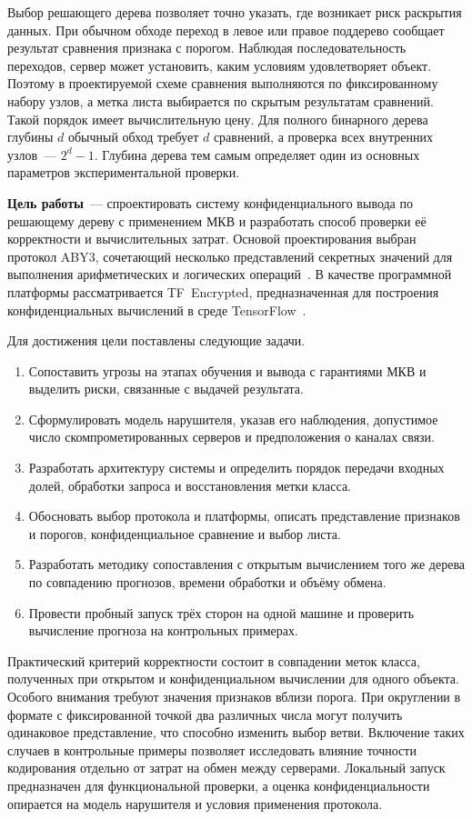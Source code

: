 Выбор решающего дерева позволяет точно указать, где возникает риск
раскрытия данных. При обычном обходе переход в левое или правое поддерево
сообщает результат сравнения признака с порогом. Наблюдая последовательность
переходов, сервер может установить, каким условиям удовлетворяет объект.
Поэтому в проектируемой схеме сравнения выполняются по фиксированному
набору узлов, а метка листа выбирается по скрытым результатам сравнений.
Такой порядок имеет вычислительную цену. Для полного бинарного дерева
глубины $d$ обычный обход требует $d$ сравнений, а проверка всех внутренних
узлов~--- $2^d-1$. Глубина дерева тем самым определяет один из основных
параметров экспериментальной проверки.

\textbf{Цель работы}~--- спроектировать систему конфиденциального вывода
по решающему дереву с применением МКВ и разработать способ проверки
её корректности и вычислительных затрат. Основой проектирования выбран
протокол ABY3, сочетающий несколько представлений секретных значений
для выполнения арифметических и логических операций~\cite{mohassel2018aby3}.
В качестве программной платформы рассматривается TF~Encrypted,
предназначенная для построения конфиденциальных вычислений в среде
TensorFlow~\cite{dahl2018tfe}.

Для достижения цели поставлены следующие задачи.
\begin{enumerate}
    \item Сопоставить угрозы на этапах обучения и вывода с гарантиями МКВ
    и выделить риски, связанные с выдачей результата.
    \item Сформулировать модель нарушителя, указав его наблюдения,
    допустимое число скомпрометированных серверов и предположения о каналах связи.
    \item Разработать архитектуру системы и определить порядок передачи
    входных долей, обработки запроса и восстановления метки класса.
    \item Обосновать выбор протокола и платформы, описать представление
    признаков и порогов, конфиденциальное сравнение и выбор листа.
    \item Разработать методику сопоставления с открытым вычислением того же
    дерева по совпадению прогнозов, времени обработки и объёму обмена.
    \item Провести пробный запуск трёх сторон на одной машине
    и проверить вычисление прогноза на контрольных примерах.
\end{enumerate}

Практический критерий корректности состоит в совпадении меток класса,
полученных при открытом и конфиденциальном вычислении для одного объекта.
Особого внимания требуют значения признаков вблизи порога. При округлении
в формате с фиксированной точкой два различных числа могут получить
одинаковое представление, что способно изменить выбор ветви. Включение
таких случаев в контрольные примеры позволяет исследовать влияние точности
кодирования отдельно от затрат на обмен между серверами. Локальный запуск
предназначен для функциональной проверки, а оценка конфиденциальности
опирается на модель нарушителя и условия применения протокола.
